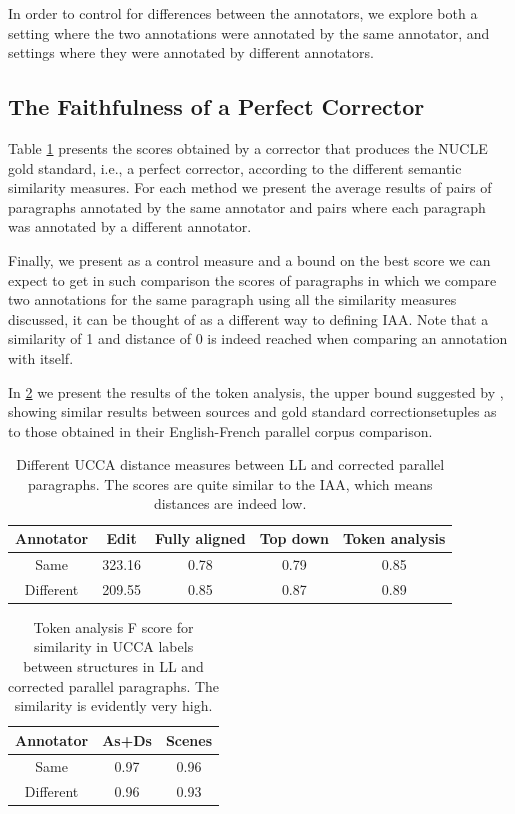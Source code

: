 \documentclass[letter,11pt]{article}
\begin{document}
{In order to control for differences between the annotators, we explore both
a setting where the two annotations were annotated by the same annotator,
and settings where they were annotated by different annotators.


\subsection{The Faithfulness of a Perfect Corrector}

Table \ref{tab:Distances} presents the scores obtained by a corrector
that produces the NUCLE gold standard, i.e., a perfect corrector, according
to the different semantic similarity measures.
For each method we present the average results of pairs
of paragraphs annotated by the same annotator and pairs where each
paragraph was annotated by a different annotator.

Finally, we present as a control measure and a bound on the best score
we can expect to get in such comparison the scores of paragraphs
in which we compare two annotations for the same paragraph using all
the similarity measures discussed, it can be thought of as a different
way to defining IAA. Note that a similarity
of 1 and distance of 0 is indeed reached when comparing an annotation with itself.

In \ref{tab:Token_analysis} we present the results of the token analysis, the
upper bound suggested by \cite{sulem2015conceptual}, showing similar
results between sources and gold standard correctionsetuples as to those obtained
in their English-French parallel corpus comparison.


\begin{table}[h!]
  \centering
  \singlespacing
  \begin{tabular}{c|c|c|c|c}
    Annotator & Edit & Fully aligned & Top down & Token analysis
    \\
    \hline
    Same & 323.16 & 0.78 & 0.79 & 0.85
    \\
    Different & 209.55 & 0.85 & 0.87 & 0.89
    \\
  \end{tabular}
  \caption{Different UCCA distance measures between LL and corrected parallel paragraphs. The scores are quite similar to the IAA, which means distances are indeed low.\label{tab:Distances}}
\end{table}


\begin{table}[h!]
  \centering
  \begin{tabular}{c|c|c}
    Annotator& As+Ds & Scenes\\
    \hline
    Same  & 0.97 & 0.96\\
    Different & 0.96
    & 0.93
    \\
  \end{tabular}
  \caption{Token analysis F score for similarity in UCCA labels between structures in LL and corrected parallel paragraphs. The similarity is evidently very high.\label{tab:Token_analysis}}
\end{table}

}
\end{document}
